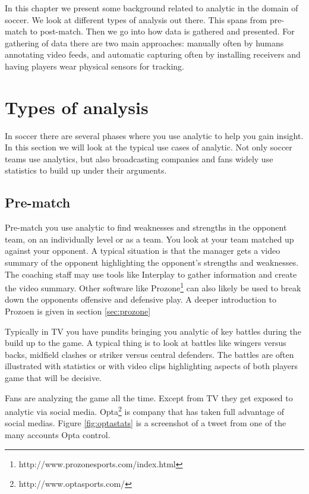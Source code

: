 In this chapter we present some background related to analytic in the domain of soccer. We look at different types of analysis out there. This spans from pre-match to post-match. Then we go into how data is gathered and presented. For gathering of data there are two main approaches: manually often by humans annotating video feeds, and automatic capturing often by installing receivers and having players wear physical sensors for tracking.

\section{Types of analysis}

In soccer there are several phases where you use analytic to help you gain insight. In this section we will look at the typical use cases of analytic. Not only soccer teams use analytics, but also broadcasting companies and fans widely use statistics to build up under their arguments.

\subsection{Pre-match}

Pre-match you use analytic to find weaknesses and strengths in the opponent team, on an individually level or as a team. You look at your team matched up against your opponent. A typical situation is that the manager gets a video summary of the opponent highlighting the opponent’s strengths and weaknesses. The coaching staff may use tools like Interplay to gather information and create the video summary. Other software like Prozone\footnote{http://www.prozonesports.com/index.html} can also likely be used to break down the opponents offensive and defensive play. A deeper introduction to Prozoen is given in section \ref{sec:prozone}

Typically in TV you have pundits bringing you analytic of key battles during the build up to the game. A typical thing is to look at battles like wingers versus backs, midfield clashes or striker versus central defenders. The battles are often illustrated with statistics or with video clips highlighting aspects of both players game that will be decisive. 

Fans are analyzing the game all the time. Except from TV they get exposed to analytic via social media. Opta\footnote{http://www.optasports.com/} is company that has taken full advantage of social medias. Figure \ref{fig:optastats} is a screenshot of a tweet from one of the many accounts Opta control. 

